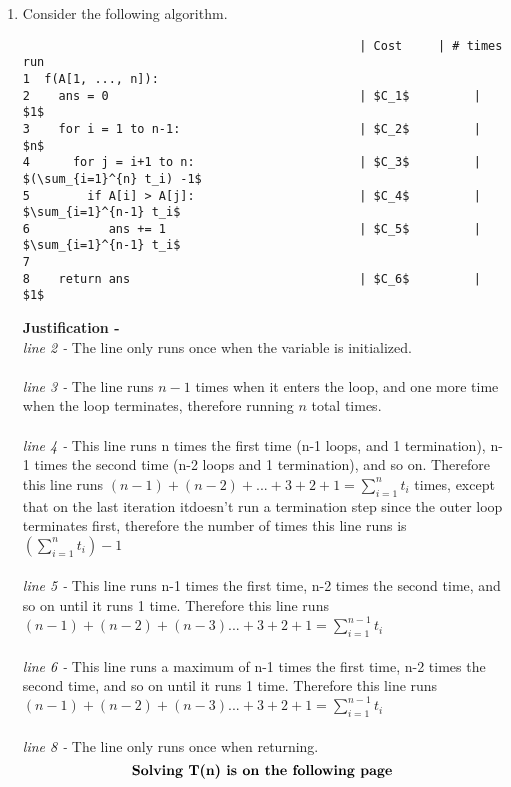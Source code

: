 \documentclass[9pt]{article}
\begin{document}
\begin{enumerate}
\item Consider the following algorithm. \label{3a}
\begin{lstlisting}
                                               | Cost     | # times run
1  f(A[1, ..., n]): 
2    ans = 0                                   | $C_1$         | $1$
3    for i = 1 to n-1:                         | $C_2$         | $n$
4      for j = i+1 to n:                       | $C_3$         | $(\sum_{i=1}^{n} t_i) -1$
5        if A[i] > A[j]:                       | $C_4$         | $\sum_{i=1}^{n-1} t_i$
6           ans += 1                           | $C_5$         | $\sum_{i=1}^{n-1} t_i$
7
8    return ans                                | $C_6$         | $1$
\end{lstlisting}

\textbf{Justification - }\\
	\textit{line 2 -}  The line only runs once when the variable is initialized.\\
	\\\textit{line 3 -}  The line runs $n-1$ times when it enters the loop, and one more time when the loop terminates, therefore running $n$ total times.\\
	\\\textit{line 4 -}  This line runs n times the first time (n-1 loops, and 1 termination), n-1 times the second time (n-2 loops and 1 termination), and so on. Therefore this line runs $(n-1) + (n-2) + ... + 3 + 2 + 1 =  \sum_{i=1}^{n} t_i$ times, except that  on the last iteration itdoesn't run a termination step since the outer loop terminates first, therefore the number of times this line runs is $(\sum_{i=1}^{n} t_i) -1$\\
	\\\textit{line 5 -}  This line runs n-1 times the first time, n-2 times the second time, and so on until it runs 1 time. Therefore this line runs $(n-1) + (n-2) + (n-3) ... + 3 + 2 + 1 = \sum_{i=1}^{n-1} t_i$\\
	\\\textit{line 6 -}  This line runs a maximum of n-1 times the first time, n-2 times the second time, and so on until it runs 1 time. Therefore this line runs $(n-1) + (n-2) + (n-3) ... + 3 + 2 + 1 = \sum_{i=1}^{n-1} t_i$\\
	\\\textit{line 8 -}  The line only runs once when returning.\\
	$$\text{\textbf{Solving T(n) is on the following page}}$$
\newpage


\end{enumerate}
\end{document}
